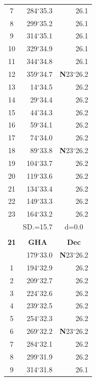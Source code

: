 \documentclass[10pt, a4paper]{report}
\begin{document}
\begin{scriptsize}
\begin{tabular*}{0.2\textwidth}[t]{@{\extracolsep{\fill}}|c|rr|}
7 & 284$^\circ$35.3 & 26.1\\
8 & 299$^\circ$35.2 & 26.1\\
9 & 314$^\circ$35.1 & \raisebox{0.24ex}{\boldmath$\cdot$~\boldmath$\cdot$~~}26.1\\
10 & 329$^\circ$34.9 & 26.1\\
11 & 344$^\circ$34.8 & 26.1\\[2Pt]
12 & 359$^\circ$34.7 & \textbf{N}23$^\circ$26.2\\
13 & 14$^\circ$34.5 & 26.2\\
14 & 29$^\circ$34.4 & 26.2\\
15 & 44$^\circ$34.3 & \raisebox{0.24ex}{\boldmath$\cdot$~\boldmath$\cdot$~~}26.2\\
16 & 59$^\circ$34.1 & 26.2\\
17 & 74$^\circ$34.0 & 26.2\\[2Pt]
18 & 89$^\circ$33.8 & \textbf{N}23$^\circ$26.2\\
19 & 104$^\circ$33.7 & 26.2\\
20 & 119$^\circ$33.6 & 26.2\\
21 & 134$^\circ$33.4 & \raisebox{0.24ex}{\boldmath$\cdot$~\boldmath$\cdot$~~}26.2\\
22 & 149$^\circ$33.3 & 26.2\\
23 & 164$^\circ$33.2 & 26.2\\
\hline
\rule{0pt}{2.4ex} & \multicolumn{1}{c}{SD.=15.7} & \multicolumn{1}{c|}{d=0.0}\\
\hline
\multicolumn{1}{c}{}\\[-0.5ex]\hline
\multicolumn{1}{|c|}{\rule{0pt}{2.6ex}\textbf{21}} & \multicolumn{1}{c}{\textbf{GHA}} & \multicolumn{1}{c|}{\textbf{Dec}}\\
\hline\rule{0pt}{2.6ex}\noindent
0 & 179$^\circ$33.0 & \textbf{N}23$^\circ$26.2\\
1 & 194$^\circ$32.9 & 26.2\\
2 & 209$^\circ$32.7 & 26.2\\
3 & 224$^\circ$32.6 & \raisebox{0.24ex}{\boldmath$\cdot$~\boldmath$\cdot$~~}26.2\\
4 & 239$^\circ$32.5 & 26.2\\
5 & 254$^\circ$32.3 & 26.2\\[2Pt]
6 & 269$^\circ$32.2 & \textbf{N}23$^\circ$26.2\\
7 & 284$^\circ$32.1 & 26.2\\
8 & 299$^\circ$31.9 & 26.2\\
9 & 314$^\circ$31.8 & \raisebox{0.24ex}{\boldmath$\cdot$~\boldmath$\cdot$~~}26.1\\

\end{tabular*}
\end{scriptsize}
\end{document}
